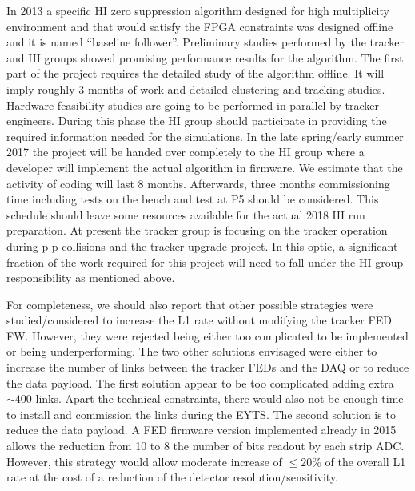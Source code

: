 In 2013 a specific HI zero suppression algorithm designed for high multiplicity environment and that would satisfy the FPGA constraints was designed offline and it is named “baseline follower”.  Preliminary studies performed by the tracker and HI groups showed promising performance results for the algorithm. The first part of the project requires the detailed study of the algorithm offline. It will imply roughly 3 months of work and detailed clustering and tracking studies. Hardware feasibility studies are going to be performed in parallel by tracker engineers. During this phase the HI group should participate in providing the required information needed for the simulations. In the late spring/early summer 2017 the project will be handed over completely to the HI group where a developer will implement the actual algorithm in firmware. We estimate that the activity of coding will last 8 months. Afterwards, three months commissioning time including tests on the bench and test at P5 should be considered. This schedule should leave some resources available for the actual 2018 HI run preparation. At present the tracker group is focusing on the tracker operation during p-p collisions and the tracker upgrade project. In this optic, a significant fraction of the work required for this project will need to fall under the HI group responsibility as mentioned above. 


For completeness, we should also report that other possible strategies were studied/considered to increase the L1 rate without modifying the tracker FED FW. However, they were rejected being either too complicated to be implemented or being underperforming. The two other solutions envisaged were either to increase the number of links between the tracker FEDs and the DAQ or to reduce the data payload. The first solution appear to be too complicated adding extra $\sim 400$ links. Apart the technical constraints, there would also not be enough time to install and commission the links during the EYTS. The second solution is to reduce the data payload. A FED firmware version implemented already in 2015 allows the reduction from 10 to 8 the number of bits readout by each strip ADC. However, this strategy would allow moderate increase of $\le 20 \%$ of the overall L1 rate at the cost of a reduction of the detector resolution/sensitivity. 